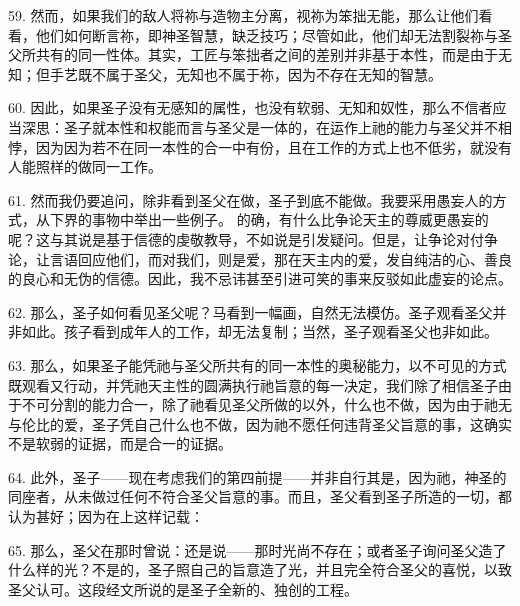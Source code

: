 59. 然而，如果我们的敌人将祢与造物主分离，视祢为笨拙无能，那么让他们看看，他们如何断言祢，即神圣智慧，缺乏技巧；尽管如此，他们却无法割裂祢与圣父所共有的同一性体。其实，工匠与笨拙者之间的差别并非基于本性，而是由于无知；但手艺既不属于圣父，无知也不属于祢，因为不存在无知的智慧。\par

60. 因此，如果圣子没有无感知的属性，也没有软弱、无知和奴性，那么不信者应当深思：圣子就本性和权能而言与圣父是一体的，在运作上祂的能力与圣父并不相悖，因为因为若不在同一本性的合一中有份，且在工作的方式上也不低劣，就没有人能照样的做同一工作。\par

61. 然而我仍要追问，除非看到圣父在做，圣子到底不能做。我要采用愚妄人的方式，从下界的事物中举出一些例子。 的确，有什么比争论天主的尊威更愚妄的呢？这与其说是基于信德的虔敬教导，不如说是引发疑问。但是，让争论对付争论，让言语回应他们，而对我们，则是爱，那在天主内的爱，发自纯洁的心、善良的良心和无伪的信德。因此，我不忌讳甚至引进可笑的事来反驳如此虚妄的论点。\par

62. 那么，圣子如何看见圣父呢？马看到一幅画，自然无法模仿。圣子观看圣父并非如此。孩子看到成年人的工作，却无法复制；当然，圣子观看圣父也非如此。\par

63. 那么，如果圣子能凭祂与圣父所共有的同一本性的奥秘能力，以不可见的方式既观看又行动，并凭祂天主性的圆满执行祂旨意的每一决定，我们除了相信圣子由于不可分割的能力合一，除了祂看见圣父所做的以外，什么也不做，因为由于祂无与伦比的爱，圣子凭自己什么也不做，因为祂不愿任何违背圣父旨意的事，这确实不是软弱的证据，而是合一的证据。\par

\par

64. 此外，圣子——现在考虑我们的第四前提——并非自行其是，因为祂，神圣的同座者，从未做过任何不符合圣父旨意的事。而且，圣父看到圣子所造的一切，都认为甚好；因为在上这样记载：\par

65. 那么，圣父在那时曾说：还是说——那时光尚不存在；或者圣子询问圣父造了什么样的光？不是的，圣子照自己的旨意造了光，并且完全符合圣父的喜悦，以致圣父认可。这段经文所说的是圣子全新的、独创的工程。\par

